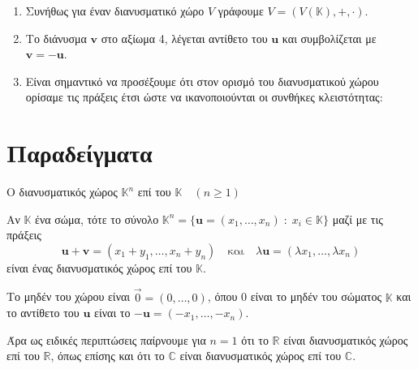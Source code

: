 \begin{rem}
\item {}
    \begin{enumerate}
        \item Συνήθως για έναν διανυσματικό χώρο $V$ γράφουμε 
            $V = (V(\mathbb{K}), +, \cdot) $.
        \item Το διάνυσμα $ \mathbf{v} $ στο αξίωμα 4, λέγεται 
            \textcolor{Col2}{αντίθετο} του $ \mathbf{u} $ και συμβολίζεται με 
            $ \mathbf{v} = - \mathbf{u} $.
        \item Είναι σημαντικό να προσέξουμε ότι στον ορισμό του διανυσματικού χώρου 
            ορίσαμε τις πράξεις έτσι ώστε να ικανοποιούνται οι συνθήκες κλειστότητας:
    \end{enumerate}
\end{rem}


\section{Παραδείγματα}

\begin{example} \label{ex:Rn}
    \textcolor{Col2}{Ο διανυσματικός χώρος $ \mathbb{K}^{n} $ 
    επί του $ \mathbb{K} \quad (n \geq 1) $}

    Αν $ \mathbb{K} $ ένα σώμα, τότε το σύνολο $ \mathbb{K}^{n} = 
    \{ \mathbf{u} = (x_{1},\ldots,x_{n}) \; : \; x_{i} \in \mathbb{K}\} $ 
    μαζί με τις πράξεις 
    \[
        \mathbf{u}+ \mathbf{v} = (x_{1}+ y_{1}, \ldots , x_{n}+y_{n}) 
        \quad \text{και} \quad \lambda \mathbf{u} = 
        ( \lambda x_{1}, \ldots, \lambda x_{n})
    \]
    είναι ένας διανυσματικός χώρος επί του $ \mathbb{K} $. 

    Το μηδέν του χώρου 
    είναι $ \vec{0} = (0,\ldots,0) $, όπου 0 είναι το μηδέν του σώματος 
    $ \mathbb{K} $ και το αντίθετο του $ \mathbf{u} $ είναι το $ - \mathbf{u} =
    (- x_{1}, \ldots, - x_{n}) $.

    Άρα ως ειδικές περιπτώσεις παίρνουμε για $ n=1 $ ότι το $ \mathbb{R} $ 
    είναι διανυσματικός χώρος επί του $ \mathbb{R} $, όπως επίσης και ότι το 
    $ \mathbb{C} $ είναι διανυσματικός χώρος επί του $ \mathbb{C} $.
\end{example} 


